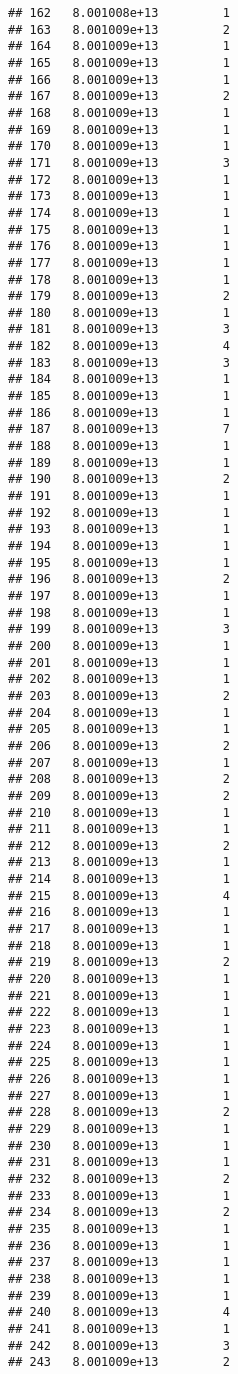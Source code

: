 \documentclass[
]{article}
\begin{document}
\begin{verbatim}
## 162   8.001008e+13         1
## 163   8.001009e+13         2
## 164   8.001009e+13         1
## 165   8.001009e+13         1
## 166   8.001009e+13         1
## 167   8.001009e+13         2
## 168   8.001009e+13         1
## 169   8.001009e+13         1
## 170   8.001009e+13         1
## 171   8.001009e+13         3
## 172   8.001009e+13         1
## 173   8.001009e+13         1
## 174   8.001009e+13         1
## 175   8.001009e+13         1
## 176   8.001009e+13         1
## 177   8.001009e+13         1
## 178   8.001009e+13         1
## 179   8.001009e+13         2
## 180   8.001009e+13         1
## 181   8.001009e+13         3
## 182   8.001009e+13         4
## 183   8.001009e+13         3
## 184   8.001009e+13         1
## 185   8.001009e+13         1
## 186   8.001009e+13         1
## 187   8.001009e+13         7
## 188   8.001009e+13         1
## 189   8.001009e+13         1
## 190   8.001009e+13         2
## 191   8.001009e+13         1
## 192   8.001009e+13         1
## 193   8.001009e+13         1
## 194   8.001009e+13         1
## 195   8.001009e+13         1
## 196   8.001009e+13         2
## 197   8.001009e+13         1
## 198   8.001009e+13         1
## 199   8.001009e+13         3
## 200   8.001009e+13         1
## 201   8.001009e+13         1
## 202   8.001009e+13         1
## 203   8.001009e+13         2
## 204   8.001009e+13         1
## 205   8.001009e+13         1
## 206   8.001009e+13         2
## 207   8.001009e+13         1
## 208   8.001009e+13         2
## 209   8.001009e+13         2
## 210   8.001009e+13         1
## 211   8.001009e+13         1
## 212   8.001009e+13         2
## 213   8.001009e+13         1
## 214   8.001009e+13         1
## 215   8.001009e+13         4
## 216   8.001009e+13         1
## 217   8.001009e+13         1
## 218   8.001009e+13         1
## 219   8.001009e+13         2
## 220   8.001009e+13         1
## 221   8.001009e+13         1
## 222   8.001009e+13         1
## 223   8.001009e+13         1
## 224   8.001009e+13         1
## 225   8.001009e+13         1
## 226   8.001009e+13         1
## 227   8.001009e+13         1
## 228   8.001009e+13         2
## 229   8.001009e+13         1
## 230   8.001009e+13         1
## 231   8.001009e+13         1
## 232   8.001009e+13         2
## 233   8.001009e+13         1
## 234   8.001009e+13         2
## 235   8.001009e+13         1
## 236   8.001009e+13         1
## 237   8.001009e+13         1
## 238   8.001009e+13         1
## 239   8.001009e+13         1
## 240   8.001009e+13         4
## 241   8.001009e+13         1
## 242   8.001009e+13         3
## 243   8.001009e+13         2

\end{verbatim}
\end{document}
